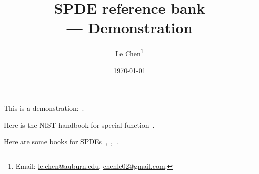 \documentclass[a4paper,11pt]{article}
\title{SPDE reference bank \\
--- Demonstration}
\author{Le Chen\footnote{Email: \url{le.chen@auburn.edu}, \url{chenle02@gmail.com}.}}
\date{\today}
\begin{document}
\maketitle

This is a demonstration:~\cite{chen.dalang:12:nonlinear}.


Here is the NIST handbook for special function~\cite{olver.lozier.ea:10:nist}.

Here are some books for
SPDEs~\cite{dalang.khoshnevisan.ea:09:minicourse},~\cite{da-prato.zabczyk:92:stochastic},~\cite{liu.rockner:15:stochastic}.

\printbibliography
\end{document}
